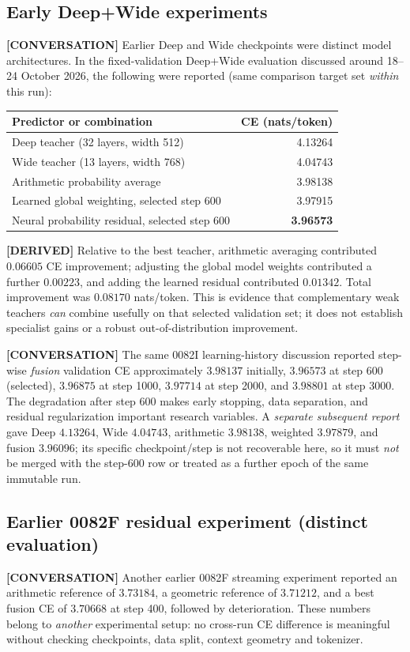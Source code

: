 \documentclass[11pt,letterpaper]{article}
\newcommand{\tagg}[1]{\textsf{\footnotesize\color{sea}\textbf{[#1]}}}
\begin{document}
\subsection{Early Deep+Wide experiments}
\tagg{CONVERSATION}\; Earlier Deep and Wide checkpoints were distinct model architectures. In the fixed-validation Deep+Wide evaluation discussed around 18--24 October 2026, the following were reported (same comparison target set \emph{within} this run):
\begin{center}
\begin{tabular}{@{}lr@{}}\toprule
Predictor or combination & CE (nats/token) \\
\midrule
Deep teacher (32 layers, width 512) & 4.13264 \\
Wide teacher (13 layers, width 768) & 4.04743 \\
Arithmetic probability average & 3.98138 \\
Learned global weighting, selected step 600 & 3.97915 \\
Neural probability residual, selected step 600 & \textbf{3.96573} \\
\bottomrule\end{tabular}
\end{center}
\tagg{DERIVED}\; Relative to the best teacher, arithmetic averaging contributed $0.06605$ CE improvement; adjusting the global model weights contributed a further $0.00223$, and adding the learned residual contributed $0.01342$. Total improvement was $0.08170$ nats/token. This is evidence that complementary weak teachers \emph{can} combine usefully on that selected validation set; it does not establish specialist gains or a robust out-of-distribution improvement.

\tagg{CONVERSATION}\; The same 0082I learning-history discussion reported step-wise \emph{fusion} validation CE approximately $3.98137$ initially, $3.96573$ at step 600 (selected), $3.96875$ at step 1000, $3.97714$ at step 2000, and $3.98801$ at step 3000. The degradation after step 600 makes early stopping, data separation, and residual regularization important research variables. A \emph{separate subsequent report} gave Deep $4.13264$, Wide $4.04743$, arithmetic $3.98138$, weighted $3.97879$, and fusion $3.96096$; its specific checkpoint/step is not recoverable here, so it must \emph{not} be merged with the step-600 row or treated as a further epoch of the same immutable run.

\subsection{Earlier 0082F residual experiment (distinct evaluation)}
\tagg{CONVERSATION}\; Another earlier 0082F streaming experiment reported an arithmetic reference of $3.73184$, a geometric reference of $3.71212$, and a best fusion CE of $3.70668$ at step 400, followed by deterioration. These numbers belong to \emph{another} experimental setup: no cross-run CE difference is meaningful without checking checkpoints, data split, context geometry and tokenizer.
\end{document}
